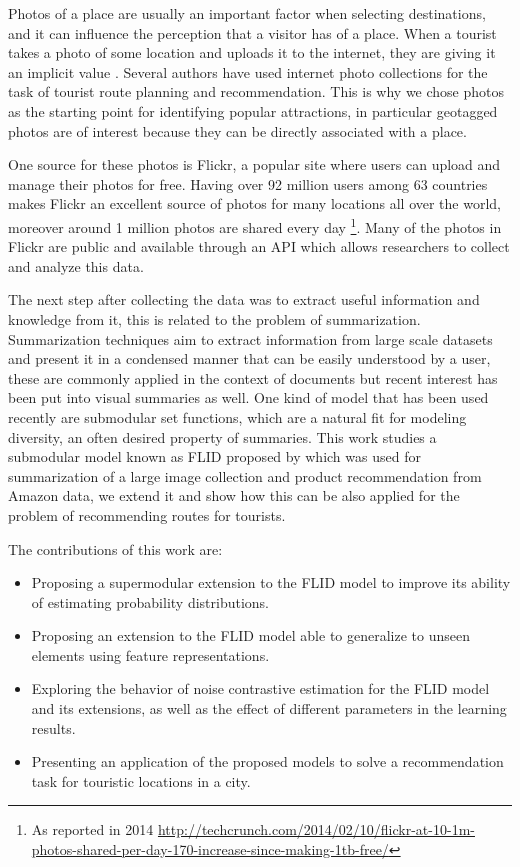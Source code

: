 Photos of a place are usually an important factor when selecting destinations, and it can influence the perception that a visitor has of a place. When a tourist takes a photo of some location and uploads it to the internet, they are giving it an implicit value  \citep{Donaire2014}. Several authors have used internet photo collections for the task of tourist route planning and recommendation. This is why we chose photos as the starting point for identifying popular attractions, in particular geotagged photos are of interest because they can be directly associated with a place.

One source for these photos is Flickr, a popular site where users can upload and manage their photos for free. Having over 92 million users among 63 countries makes Flickr an excellent source of photos for many locations all over the world, moreover around 1 million photos are shared every day \footnote{As reported in 2014 \url{http://techcrunch.com/2014/02/10/flickr-at-10-1m-photos-shared-per-day-170-increase-since-making-1tb-free/}}. Many of the photos in Flickr are public and available through an API which allows researchers to collect and analyze this data.

The next step after collecting the data was to extract useful information and knowledge from it, this is related to the problem of summarization. Summarization techniques aim to extract information from large scale datasets and present it in a condensed manner that can be easily understood by a user, these are commonly applied in the context of documents but recent interest has been put into visual summaries as well. One kind of model that has been used recently are submodular set functions, which are a natural fit for modeling diversity, an often desired property of summaries. This work studies a submodular model known as FLID proposed by \citet{tschiatschek16learning} which was used for summarization of a large image collection and product recommendation from Amazon data, we extend it and show how this can be also applied for the problem of recommending routes for tourists.

The contributions of this work are:

\begin{itemize}
  \item Proposing a supermodular extension to the FLID model to improve its ability of estimating probability distributions.
  \item Proposing an extension to the FLID model able to generalize to unseen elements using feature representations.
  \item Exploring the behavior of noise contrastive estimation for the FLID model and its extensions, as well as the effect of different parameters in the learning results.
  \item Presenting an application of the proposed models to solve a recommendation task for touristic locations in a city.
\end{itemize}

